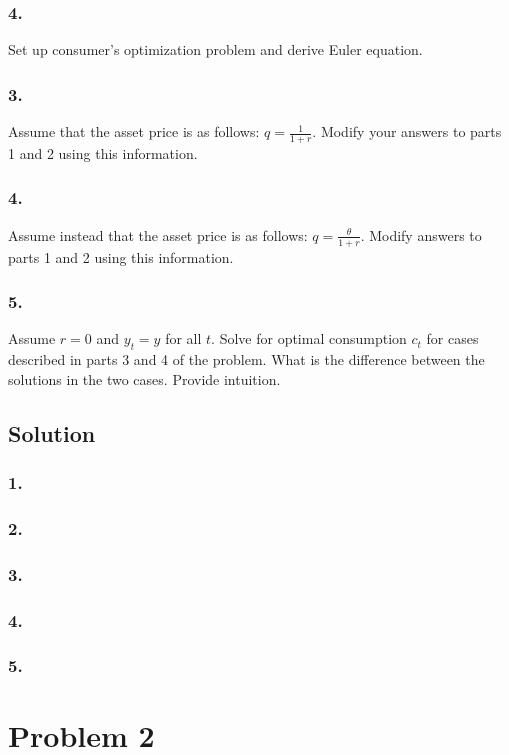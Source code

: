 \documentclass[10pt, a4paper]{article}
\begin{document}
    \subsubsection*{4.}
      Set up consumer's optimization problem and derive Euler equation.
    \subsubsection*{3.}
      Assume that the asset price is as follows: $q=\frac{1}{1+r}$. Modify your answers to parts 1 and 2 using this information.
    \subsubsection*{4.}
      Assume instead that the asset price is as follows: $q=\frac{\theta}{1+r}$. Modify answers to parts 1 and 2 using this information.
    \subsubsection*{5.}
      Assume $r=0$ and $y_t=y$ for all $t$. Solve for optimal consumption $c_t$ for cases described in parts 3 and 4 of the problem. What is the difference between the solutions in the two cases. Provide intuition. 
  \subsection*{Solution}
    \subsubsection*{1.}
    \subsubsection*{2.}
    \subsubsection*{3.}
    \subsubsection*{4.}
    \subsubsection*{5.}
  \section*{Problem 2}
\end{document}

